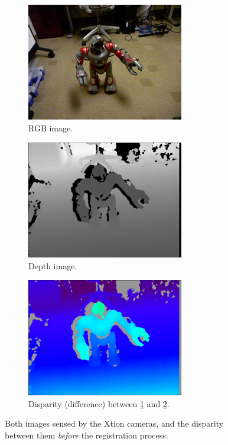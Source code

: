 		\begin{figure}[h!]
			\centering
			\begin{subfigure}[h]{0.4\linewidth}
				\centering
				\includegraphics[width=2.7in]{images/rgb_before}
				\caption{RGB image.}
				\label{fig:3_rgb_bef_reg}
			\end{subfigure}
			\hfill
			\begin{subfigure}[h]{0.4\linewidth}
				\centering
				\includegraphics[width=2.7in]{images/depth_before}
				\caption{Depth image.}
				\label{fig:3_depth_bef_reg}
			\end{subfigure}
			
			\begin{subfigure}[h]{0.9\linewidth}
				\centering
				\includegraphics[width=2.7in]{images/disparity_before}
				\caption{Disparity (difference) between \ref{fig:3_rgb_bef_reg} and \ref{fig:3_depth_bef_reg}.}
				\label{fig:3_disparity_bef_reg}
			\end{subfigure}
			
			\caption{Both images sensed by the Xtion cameras, and the disparity between them \emph{before} the registration process.}
			\label{fig:3_bef_reg}
		\end{figure}
		
